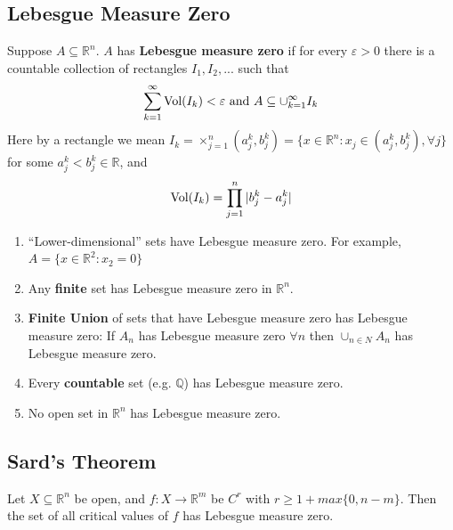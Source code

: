\documentclass[11pt]{elegantbook}
\begin{document}
\subsection{Lebesgue Measure Zero}
\begin{definition}
    \normalfont
    Suppose $A \subseteq \mathbb{R}^n$. $A$ has \textbf{Lebesgue measure zero} if for every $\varepsilon > 0$ there is a countable collection of rectangles $I_1, I_2, . . .$ such that
    \begin{equation}
        \begin{aligned}
            \sum_{k=1}^\infty\textnormal{Vol}(I_k)<\varepsilon \textnormal{ and }A\subseteq \cup_{k=1}^\infty I_k
        \end{aligned}
        \nonumber
    \end{equation}
    Here by a rectangle we mean $I_k = \times^n_{j=1}(a^k_j , b^k_j)=\{x\in \mathbb{R}^n: x_j\in (a^k_j , b^k_j), \forall j\}$ for some $a^k_j < b^k_j \in \mathbb{R}$, and
    \begin{equation}
        \begin{aligned}
            \textnormal{Vol}(I_k)=\prod_{j=1}^n|b^k_j-a^k_j|
        \end{aligned}
        \nonumber
    \end{equation}
\end{definition}

\begin{example}
    \begin{enumerate}
        \item “Lower-dimensional” sets have Lebesgue measure zero. For example, $A=\{x\in\mathbb{R}^2:x_2=0\}$
        \item Any \textbf{finite} set has Lebesgue measure zero in $\mathbb{R}^n$.
        \item \textbf{Finite Union} of sets that have Lebesgue measure zero has Lebesgue measure zero: If $A_n$ has Lebesgue measure zero $\forall n$ then $\cup_{n\in N}A_n$ has Lebesgue measure zero.
        \item Every \textbf{countable} set (e.g. $\mathbb{Q}$) has Lebesgue measure zero.
        \item No open set in $\mathbb{R}^n$ has Lebesgue measure zero.
    \end{enumerate}
\end{example}


\subsection{Sard's Theorem}
\begin{theorem}
    Let $X \subseteq \mathbb{R}^n$ be open, and $f : X \rightarrow \mathbb{R}^m$ be $C^r$ with $r \geq 1 + max\{0, n - m\}$. Then the set of all critical values of $f$ has Lebesgue measure zero.
\end{theorem}
\end{document}
